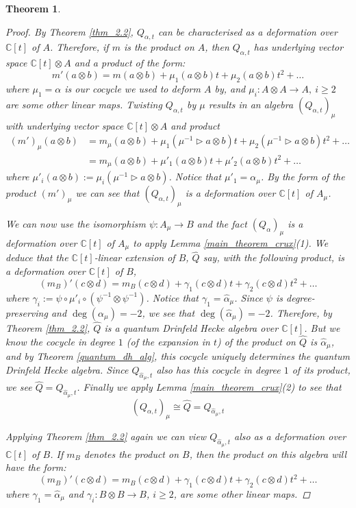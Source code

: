 \documentclass[10pt]{article}
\newcommand{\bb}{\medbreak}
\newcommand{\nt}{\noindent}
\newcommand{\Cc }{\mathbb{C}}
\newcommand{\rt}{\xrightarrow{}}
\newtheorem{theorem}[lemma]{Theorem}
\theoremstyle{definition}
\begin{document}
\begin{theorem}
\begin{proof}
\nt By Theorem \ref{thm_2.2}, $Q_{\alpha,t}$ can be characterised as a deformation over $\Cc[t]$ of $A$. Therefore, if $m$ is the product on $A$, then $Q_{\alpha,t}$ has underlying vector space $\Cc[t] \otimes A$ and a product of the form:
$$m'(a\otimes b)=m(a\otimes b)+\mu_1(a\otimes b)t+\mu_2(a\otimes b)t^2+\dots$$ 
where $\mu_1=\alpha$ is our cocycle we used to deform $A$ by, and $\mu_i:A\otimes A\rt A,\ i\geq 2$ are some other linear maps. Twisting $Q_{\alpha,t}$ by $\mu$ results in an algebra $(Q_{\alpha,t})_\mu$ with underlying vector space $\Cc[t]\otimes A$ and product 
\begin{align*}%
(m')_\mu(a\otimes b) & =m_\mu(a\otimes b)+\mu_1(\mu^{-1}\rhd a\otimes b)t+\mu_2(\mu^{-1}\rhd a\otimes b)t^2+\dots \\
& =m_\mu(a\otimes b)+\mu'_1(a\otimes b)t+\mu'_2(a\otimes b)t^2+\dots\nonumber
\end{align*}
where $\mu'_i(a\otimes b):=\mu_i(\mu^{-1}\rhd a\otimes b)$. Notice that $\mu'_1=\alpha_\mu$. By the form of the product $(m')_\mu$ we can see that $(Q_{\alpha,t})_\mu$ is a deformation over $\Cc[t]$ of $A_\mu$.\bb

\nt We can now use the isomorphism $\psi:A_\mu\rt B$ and the fact $(Q_\alpha)_\mu$ is a deformation over $\Cc[t]$ of $A_\mu$ to apply Lemma \ref{main_theorem_crux}(1). We deduce that the $\Cc[t]$-linear extension of $B$, $\hat Q$ say, with the following product, is a deformation over $\Cc[t]$ of $B$,
$$(m_B)'(c\otimes d)=m_B(c\otimes d)+\gamma_1(c\otimes d)t+\gamma_2(c\otimes d)t^2+\dots$$
where $\gamma_i:=\psi\circ \mu'_i\circ (\psi^{-1}\otimes \psi^{-1})$. Notice that $\gamma_1=\hat{\alpha}_\mu$. Since $\psi$ is degree-preserving and $\deg(\alpha_\mu)=-2$, we see that $\deg(\hat \alpha_\mu)=-2$. Therefore, by Theorem \ref{thm_2.2}, $\hat Q$ is a quantum Drinfeld Hecke algebra over $\Cc[t]$. But we know the cocycle in degree $1$ (of the expansion in $t$) of the product on $\hat Q$ is $\hat \alpha_\mu$, and by Theorem \ref{quantum_dh_alg}, this cocycle uniquely determines the quantum Drinfeld Hecke algebra. Since $Q_{\hat \alpha_\mu,t}$ also has this cocycle in degree $1$ of its product, we see $\hat Q = Q_{\hat \alpha_\mu,t}$. Finally we apply Lemma \ref{main_theorem_crux}(2) to see that 
\begin{equation}\label{main_thm_stronger_result}
(Q_{\alpha,t})_\mu\cong \hat Q=Q_{\hat \alpha_\mu,t}
\end{equation}

\iffalse
\nt Applying Theorem \ref{thm_2.2} again we can view $Q_{\hat{\alpha}_\mu , t}$ also as a deformation over $\Cc[t]$ of $B$. If $m_B$ denotes the product on $B$, then the product on this algebra will have the form:
$$(m_B)'(c\otimes d)=m_B(c\otimes d)+\gamma_1(c\otimes d)t+\gamma_2(c\otimes d)t^2+\dots$$
where $\gamma_1=\hat{\alpha}_\mu$ and $\gamma_i:B\otimes B\rt B$, $i\geq 2$, are some other linear maps.\bb


\end{proof}
\end{theorem}
\end{document}
